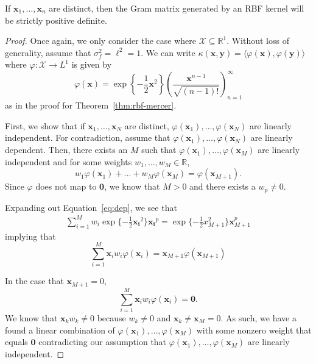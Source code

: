 \begin{lemma}
    \label{lem:rbf-pd}
    If $\mathbf{x}_1, \ldots, \mathbf{x}_n$ are distinct, then the Gram matrix generated by an RBF kernel will be strictly positive definite.
\end{lemma}
\begin{proof}
    Once again, we only consider the case where $\mathcal{X} \subseteq \mathbb{R}^{1}$.
    Without loss of generality, assume that $\sigma_f^2 = \ell^2 = 1$.
    We can write $\kappa(\mathbf{x}, \mathbf{y}) = \langle \varphi(\mathbf{x}), \varphi(\mathbf{y}) \rangle$
    where $\varphi: \mathcal{X} \to L^{1}$ is given by
    \begin{equation*}
        \varphi(\mathbf{x}) = \exp\left\{-\frac12 \mathbf{x}^2 \right\} \left(\frac{ \mathbf{x}^{n - 1} }{ \sqrt{(n - 1)!} }\right)_{n=1}^{\infty}
    \end{equation*}
    as in the proof for Theorem~\ref{thm:rbf-mercer}.

    First, we show that if $\mathbf{x}_1, \ldots, \mathbf{x}_N$ are distinct, $\varphi(\mathbf{x}_1), \ldots, \varphi(\mathbf{x}_N)$ are linearly independent.
    For contradiction, assume that $\varphi(\mathbf{x}_1), \ldots, \varphi(\mathbf{x}_N)$ are linearly dependent.
    Then, there exists an $M$ such that $\varphi(\mathbf{x}_1), \ldots, \varphi(\mathbf{x}_M)$
    are linearly independent and for some weights $w_1, \ldots, w_M \in \mathbb{R}$,
    \begin{equation}
        \label{eq:dep}
        w_1 \varphi(\mathbf{x}_1) + \ldots + w_M \varphi(\mathbf{x}_M) = \varphi(\mathbf{x}_{M + 1}).
    \end{equation}
    Since $\varphi$ does not map to $\mathbf{0}$, we know that $M > 0$ and there exists a $w_p \neq 0$.

    Expanding out Equation~\ref{eq:dep}, we see that
    \begin{align*}
        \sum\limits_{i = 1}^{M} w_i \exp \{ -\frac12 \mathbf{x_i}^2 \} \mathbf{x_i}^{p}
        = \exp \{ -\frac12 x_{M + 1}^2 \} \mathbf{x}_{M+1}^{p}
    \end{align*}
    implying that
    \begin{equation*}
        \sum\limits_{i=1}^{M} \mathbf{x}_i w_i \varphi(\mathbf{x}_i)  = \mathbf{x}_{M + 1} \varphi(\mathbf{x}_{M + 1})
    \end{equation*}

    In the case that $\mathbf{x}_{M + 1} = 0$,
    \begin{equation*}
        \sum\limits_{i=1}^{M} \mathbf{x}_i w_i \varphi(\mathbf{x}_i) = \mathbf{0}.
    \end{equation*}
    We know that $\mathbf{x}_k w_k \neq 0$ because $w_k \neq 0$ and $\mathbf{x}_k \neq \mathbf{x}_M = 0$. 
    As such, we have a found a linear combination of $\varphi(\mathbf{x}_1), \ldots, \varphi(\mathbf{x}_M)$ with some nonzero weight that equals $\mathbf{0}$ contradicting our assumption that $\varphi(\mathbf{x}_1), \ldots, \varphi(\mathbf{x}_M)$ are linearly independent.


\end{proof}
